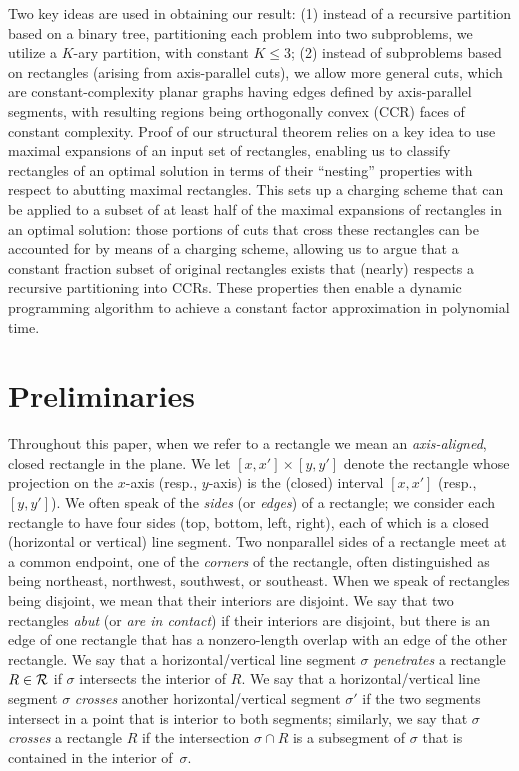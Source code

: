 \documentclass{article}
\begin{document}
Two key ideas are used in obtaining our result: (1) instead of a
recursive partition based on a binary tree, partitioning each problem
into two subproblems, we utilize a $K$-ary partition, with constant
$K\leq 3$; (2) instead of subproblems based on rectangles (arising
from axis-parallel cuts), we allow more general cuts, which are
constant-complexity planar graphs having edges defined by
axis-parallel segments, with resulting regions being orthogonally
convex (CCR) faces of constant complexity.  Proof of our structural
theorem relies on a key idea to use maximal expansions of an input set
of rectangles, enabling us to classify rectangles of an optimal
solution in terms of their ``nesting'' properties with respect to
abutting maximal rectangles. This sets up a charging scheme that can
be applied to a subset of at least half of the maximal expansions of
rectangles in an optimal solution: those portions of cuts that cross
these rectangles can be accounted for by means of a charging scheme,
allowing us to argue that a constant fraction subset of original
rectangles exists that (nearly) respects a recursive partitioning into
CCRs. These properties then enable a dynamic programming algorithm to
achieve a constant factor approximation in polynomial time.


\section{Preliminaries}

Throughout this paper, when we refer to a rectangle we mean an
{\em axis-aligned}, closed rectangle in the plane.
%
We let $[x,x']\times[y,y']$ denote the rectangle whose projection on
the $x$-axis (resp., $y$-axis) is the (closed) interval $[x,x']$
(resp., $[y,y']$).
%
We often speak of the {\em sides} (or {\em edges}) of a rectangle; we
consider each rectangle to have four sides (top, bottom, left, right),
each of which is a closed (horizontal or vertical) line segment. Two
nonparallel sides of a rectangle meet at a common endpoint, one of the
{\em corners} of the rectangle, often distinguished as being
northeast, northwest, southwest, or southeast.
%
When we speak of rectangles being disjoint, we mean that their
interiors are disjoint.
%
We say that two rectangles {\em abut} (or {\em are in contact}) if
their interiors are disjoint, but there is an edge of one rectangle
that has a nonzero-length overlap with an edge of the other rectangle.
%
We say that a horizontal/vertical line segment $\sigma$ {\em
  penetrates} a rectangle $R\in{\cal R}$ if $\sigma$ intersects the
interior of $R$.  We say that a horizontal/vertical line segment
$\sigma$ {\em crosses} another horizontal/vertical segment $\sigma'$
if the two segments intersect in a point that is interior to both
segments; similarly, we say that $\sigma$ {\em crosses} a rectangle
$R$ if the intersection $\sigma\cap R$ is a subsegment of $\sigma$
that is contained in the interior of~$\sigma$.
\end{document}
